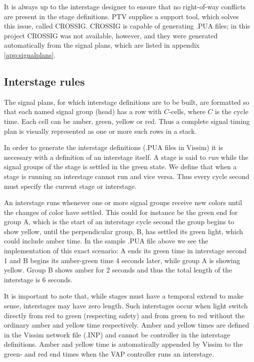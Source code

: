 It is always up to the interstage designer to ensure that no right-of-way conflicts are present in the stage definitions. PTV supplies a support tool, which solves this issue, called CROSSIG. CROSSIG is capable of generating .PUA files; in this project CROSSIG was not available, however, and they were generated automatically from the signal plans, which are listed in appendix \ref{app:signalplans}.

\subsection*{Interstage rules}
The signal plans, for which interstage definitions are to be built, are formatted so that each named signal group (head) has a row with $C$-cells, where $C$ is the cycle time. Each cell can be amber, green, yellow or red. Thus a complete signal timing plan is visually represented as one or more such rows in a stack.

In order to generate the interstage definitions (.PUA files in Vissim) it is necessary with a definition of an interstage itself. A stage is said to \textit{run} while the signal groups of the stage is settled in the green state. We define that when a stage is running an interstage cannot run and vice versa. Thus every cycle second must specify the current stage or interstage.

An interstage runs whenever one or more signal groups receive new colors until the changes of color have settled. This could for instance be the green end for group A, which is the start of an interstage cycle second the group begins to show yellow, until the perpendicular group, B, has settled its green light, which could include amber time. In the sample .PUA file above we see the implementation of this exact scenario: A ends its green time in interstage second 1 and B begins its amber-green time 4 seconds later, while group A is showing yellow. Group B shows amber for 2 seconds and thus the total length of the interstage is 6 seconds. 

It is important to note that, while stages must have a temporal extend to make sense, interstages may have zero length. Such interstages occur when light switch directly from red to green (respecting safety) and from green to red without the ordinary amber and yellow time respectively. Amber and yellow times are defined in the Vissim network file (.INP) and cannot be controller in the interstage definitions. Amber and yellow time is automatically appended by Vissim to the green- and red end times when the VAP controller runs an interstage.

